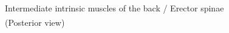 \documentclass[
  letterpaper,
  DIV=11,
  numbers=noendperiod]{scrartcl}
\begin{document}
\begin{figure}


\caption{\label{fig-intermediatebackmm310gilroyAtlasAnatomy2020}Intermediate
intrinsic muscles of the back / Erector spinae (Posterior
view)\textsuperscript{}}

\end{figure}%
\end{document}

